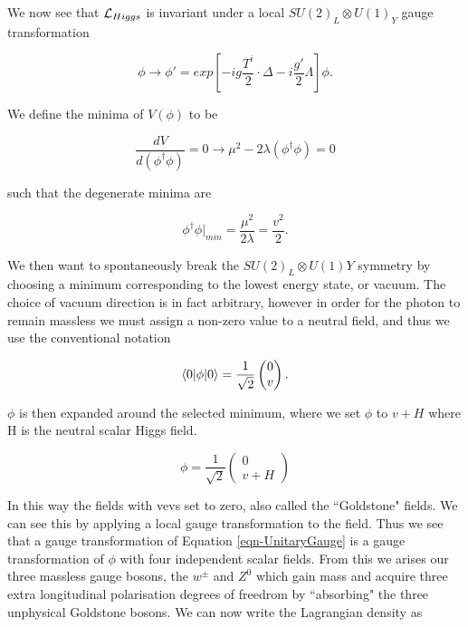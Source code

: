 We now see that $\mathcal{L}_{Higgs}$ is invariant under a local $SU(2)_L \otimes U(1)_Y$ gauge transformation 

\begin{equation}
\phi \to \phi' = exp[-ig\frac{T^i}{2}\cdot \Delta - i\frac{g'}{2}\Lambda]\phi.
\end{equation}

We define the minima of $V(\phi)$ to be 

\begin{equation}
\frac{dV}{d(\phi^\dagger\phi)} = 0 \rightarrow \mu^2 - 2\lambda(\phi^{\dagger}\phi) = 0
\end{equation}

such that the degenerate minima are

\begin{equation}
\phi^{\dagger}\phi|_{min} = \frac{\mu^2}{2\lambda} = \frac{v^2}{2}.
\end{equation}

We then want to spontaneously break the $SU(2)_L \otimes U(1)Y$ symmetry by choosing a minimum corresponding to the lowest energy state, or vacuum. The choice of vacuum direction is in fact arbitrary, however in order for the photon to remain massless we must assign a non-zero value to a neutral field, and thus we use the conventional notation

\begin{equation} \label{eqn-HiggsDoublet}
\braket{0|\phi|0} = \frac{1}{\sqrt{2}}
\begin{pmatrix}
0 \\
v
\end{pmatrix}.
\end{equation}

$\phi$ is then expanded around the selected minimum, where we set $\phi$ to $v + H$ where H is the neutral scalar Higgs field.

\begin{equation} \label{eqn-UnitaryGauge}
\phi = \frac{1}{\sqrt{2}}
\begin{pmatrix}
0 \\
v + H
\end{pmatrix}
\end{equation}

In this way the fields with vevs set to zero, also called the ``Goldstone" fields. We can see this by applying a local gauge transformation to the field. Thus we see that a gauge transformation of Equation \ref{eqn-UnitaryGauge} is a gauge transformation of $\phi$ with four independent scalar fields. From this we arises our three massless gauge bosons, the $w^{\pm}$ and $Z^0$ which gain mass and acquire three extra longitudinal polarisation degrees of freedrom by ``absorbing" the three unphysical Goldstone bosons. We can now write the Lagrangian density as 

